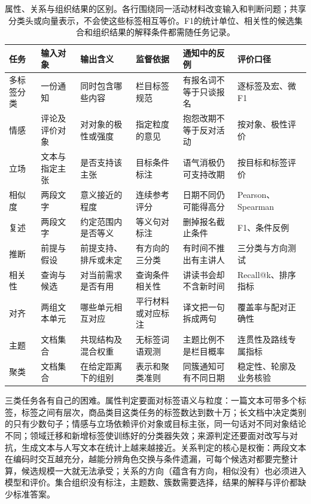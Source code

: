 \begin{table}[htbp]
  \centering
  \small
  \begin{tabularx}{\linewidth}{@{}>{\raggedright\arraybackslash}p{16mm}
    >{\raggedright\arraybackslash}p{22mm}>{\raggedright\arraybackslash}X
    >{\raggedright\arraybackslash}p{23mm}>{\raggedright\arraybackslash}X
    >{\raggedright\arraybackslash}p{22mm}@{}}
    \toprule
    任务 & 输入对象 & 输出含义 & 监督依据 & 通知中的反例 & 评价口径 \\
    \midrule
    多标签分类 & 一份通知 & 同时包含哪些内容 & 栏目标签规范 & 有报名词不等于只谈报名 & 逐标签及宏、微F1 \\
    情感 & 评论及评价对象 & 对对象的极性或强度 & 指定粒度的意见 & 抱怨改期不等于反对活动 & 按对象、极性评价 \\
    立场 & 文本与指定主张 & 是否支持该主张 & 目标条件标注 & 语气消极仍可支持改期 & 按目标和标签评价 \\
    相似度 & 两段文字 & 意义接近的程度 & 连续参考评分 & 日期不同仍可能得高分 & Pearson、Spearman \\
    复述 & 两段文字 & 约定范围内是否等义 & 等义句对标注 & 删掉报名截止条件 & F1、条件反例 \\
    推断 & 前提与假设 & 前提支持、排斥或未定 & 有方向的三分类 & 有时间不推出有主讲人 & 三分类与方向测试 \\
    相关性 & 查询与候选 & 对当前需求是否有用 & 查询条件相关性 & 讲读书会却不含新时间 & Recall@k、排序指标 \\
    对齐 & 两组文本单元 & 哪些单元相互对应 & 平行材料或对应标注 & 译文把一句拆成两句 & 覆盖率与配对正确性 \\
    主题 & 文档集合 & 共现结构及混合权重 & 无标签词语观测 & 主题比例不是栏目概率 & 连贯性及路线专属指标 \\
    聚类 & 文档集合 & 在给定距离下的组别 & 表示和聚类准则 & 同簇通知可有不同日期 & 稳定性、轮廓及业务核验 \\
    \bottomrule
  \end{tabularx}
  \caption{属性、关系与组织结果的区别。各行围绕同一活动材料改变输入和判断问题；共享分类头或向量表示，不会使这些标签相互等价。F1的统计单位、相关性的候选集合和组织结果的解释条件都需随任务记录。}
  \label{tab:nlp-classification-task-meaning}
\end{table}

三类任务各有自己的困难。属性判定要面对标签语义与粒度：一篇文本可带多个标签，标签之间有层次，商品类目这类任务的标签数达到数十万；长文档中决定类别的只有少数句子；情感与立场依赖评价对象或目标主张，同一句话对不同对象结论不同；领域迁移和新增标签使训练好的分类器失效；来源判定还要面对改写与对抗，生成文本与人写文本在统计上越来越接近。关系判定的核心是权衡：两段文本在编码时交互越充分，越能分辨角色交换与条件遗漏，可每个候选对都要完整计算，候选规模一大就无法承受；关系的方向（蕴含有方向，相似没有）也必须进入模型和评价。集合组织没有标注，主题数、簇数需要选择，结果的解释与评价都缺少标准答案。

